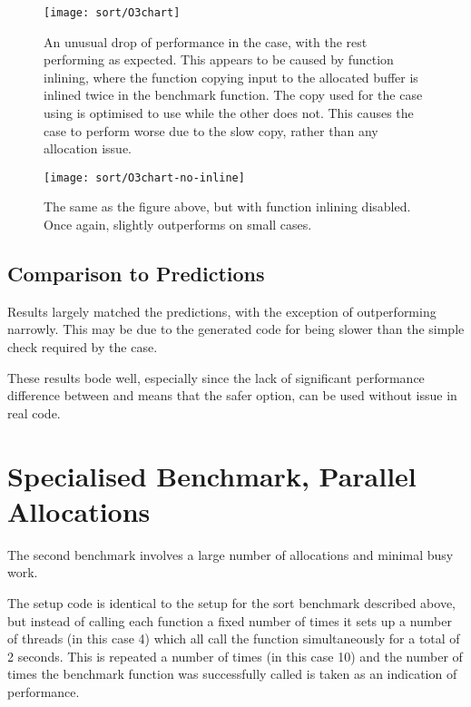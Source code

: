\begin{figure}[ph]
	\centering
	\texttt{[image: sort/O3chart]}
	\caption{An unusual drop of performance in the  case, with the rest performing as expected. This appears to be caused by function inlining, where the function copying input to the allocated buffer is inlined twice in the  benchmark function. The copy used for the case using \malloc{} is optimised to use  while the other does not. This causes the  case to perform worse due to the slow copy, rather than any allocation issue.}
\end{figure}

\begin{figure}[ph]
	\centering
	\texttt{[image: sort/O3chart-no-inline]}
	\caption{The same as the figure above, but with function inlining disabled. Once again,  slightly outperforms  on small cases.}\label{lastsort}
\end{figure}

\subsection{Comparison to Predictions}

Results largely matched the predictions, with the exception of  outperforming  narrowly. This may be due to the generated code for  being slower than the simple check required by the  case.

These results bode well, especially since the lack of significant performance difference between  and  means that the safer option,  can be used without issue in real code.

\pagebreak

\section{Specialised Benchmark, Parallel Allocations}

The second benchmark involves a large number of allocations and minimal busy work.

The setup code is identical to the setup for the sort benchmark described above, but instead of calling each function a fixed number of times it sets up a number of threads (in this case 4) which all call the function simultaneously for a total of 2 seconds. This is repeated a number of times (in this case 10) and the number of times the benchmark function was successfully called is taken as an indication of performance.

